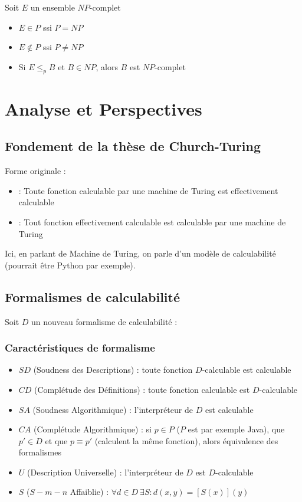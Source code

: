 Soit $E$ un ensemble $NP$-complet
\begin{itemize}
\item $E \in P$ ssi $P = NP$
\item $E \notin P$ ssi $P \neq NP$
\item Si $E \leq_p B$ et $B \in NP$, alors $B$ est $NP$-complet
\end{itemize}

\chapter{Analyse et Perspectives}

\section{Fondement de la thèse de Church-Turing}

Forme originale :
\begin{itemize}
\item {} : Toute fonction calculable par une machine de Turing est effectivement calculable
\item {} : Tout fonction effectivement calculable est calculable par une machine de Turing
\end{itemize}

Ici, en parlant de Machine de Turing, on parle d'un modèle de calculabilité (pourrait être Python par exemple).

\section{Formalismes de calculabilité}

Soit $D$ un nouveau formalisme de calculabilité :

\subsection{Caractéristiques de formalisme}

\begin{itemize}
\item $SD$ (Soudness des Descriptions) : toute fonction $D$-calculable est calculable
\item $CD$ (Complétude des Définitions) : toute fonction calculable est $D$-calculable
\item $SA$ (Soudness Algorithmique) : l'interpréteur de $D$ est calculable
\item $CA$ (Complétude Algorithmique) : si $p \in P$ ($P$ est par exemple Java), que $p' \in D$ et que $p \equiv p'$ (calculent la même fonction), alors équivalence des formalismes
\item $U$ (Description Universelle) : l'interpréteur de $D$ est $D$-calculable
\item $S$ ($S-m-n$ Affaiblie) : $\forall d \in D \ \exists S : d(x,y) = [S(x)](y)$
\end{itemize}


